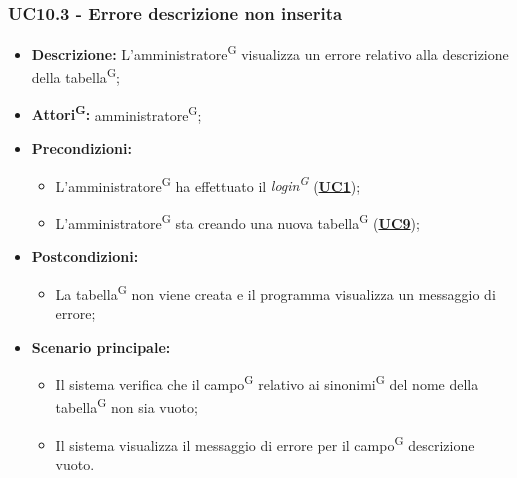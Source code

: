 \subsubsection{UC10.3 - Errore descrizione non inserita}
\label{sec:UC10.3}
\begin{itemize}
	\item \textbf{Descrizione:} L’amministratore\textsuperscript{G} visualizza un errore relativo alla descrizione della tabella\textsuperscript{G};
	\item \textbf{Attori\textsuperscript{G}:} amministratore\textsuperscript{G};
	\item \textbf{Precondizioni:} 
	\begin{itemize}
		\item L’amministratore\textsuperscript{G} ha effettuato il \textit{login\textsuperscript{G}} (\hyperref[sec:UC1]{\textbf{UC1}});
		\item L’amministratore\textsuperscript{G} sta creando una nuova tabella\textsuperscript{G} (\hyperref[sec:UC9]{\textbf{UC9}});
	\end{itemize}
	\item \textbf{Postcondizioni:} 
	\begin{itemize}
		\item La tabella\textsuperscript{G} non viene creata e il programma visualizza un messaggio di errore;
	\end{itemize}
	\item \textbf{Scenario principale:} 
	\begin{itemize}
		\item Il sistema verifica che il campo\textsuperscript{G} relativo ai sinonimi\textsuperscript{G} del nome della tabella\textsuperscript{G} non sia vuoto;
		\item Il sistema visualizza il messaggio di errore per il campo\textsuperscript{G} descrizione vuoto.
	\end{itemize}
\end{itemize}

